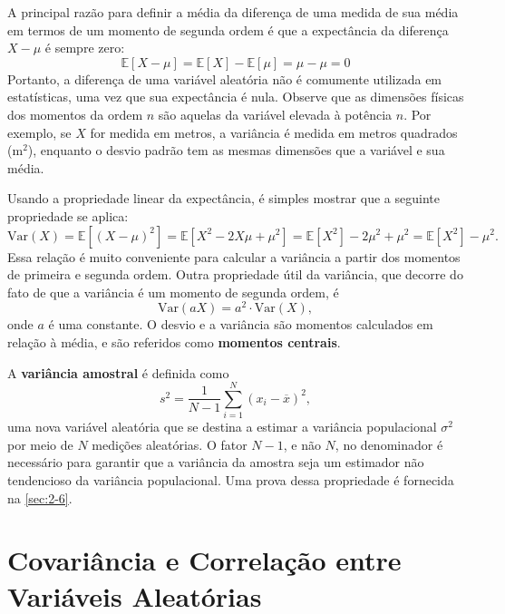 A principal razão para definir a média da diferença de uma medida de sua média em termos de um momento de segunda ordem é que a expectância da diferença $X - \mu$ é sempre zero:
\begin{equation*}
\mathbb{E}[X - \mu] = \mathbb{E}[X] - \mathbb{E}[\mu] = \mu - \mu = 0
\end{equation*}
Portanto, a diferença de uma variável aleatória não é comumente utilizada em estatísticas, uma vez que sua expectância é nula. Observe que as dimensões físicas dos momentos da ordem $n$ são aquelas da variável elevada à potência $n$. Por exemplo, se $X$ for medida em metros, a variância é medida em metros quadrados ($\text{m}^2$), enquanto o desvio padrão tem as mesmas dimensões que a variável e sua média.

Usando a propriedade linear da expectância, é simples mostrar que a seguinte propriedade se aplica:
\begin{equation}\label{2.12}
\text{Var}(X) = \mathbb{E}[(X - \mu)^2] = \mathbb{E}[X^2 - 2X\mu + \mu^2] = \mathbb{E}[X^2] - 2\mu^2 + \mu^2 = \mathbb{E}[X^2] - \mu^2.
\end{equation}
Essa relação é muito conveniente para calcular a variância a partir dos momentos de primeira e segunda ordem. Outra propriedade útil da variância, que decorre do fato de que a variância é um momento de segunda ordem, é
\begin{equation}\label{2.13}
\text{Var}(aX) = a^2 \cdot \text{Var}(X),
\end{equation}
onde $a$ é uma constante. O desvio e a variância são momentos calculados em relação à média, e são referidos como \textbf{momentos centrais}.

A \textbf{variância amostral} é definida como
\begin{equation}\label{2.14}
s^2 = \dfrac{1}{N -1} \sum_{i=1}^N (x_i - \overline{x})^2,
\end{equation}
uma nova variável aleatória que se destina a estimar a variância populacional $\sigma^2$ por meio de $N$ medições aleatórias. O fator $N - 1$, e não $N$, no denominador é necessário para garantir que a variância da amostra seja um estimador não tendencioso da variância populacional. Uma prova dessa propriedade é fornecida na \autoref{sec:2-6}.

\section{Covariância e Correlação entre Variáveis Aleatórias}

